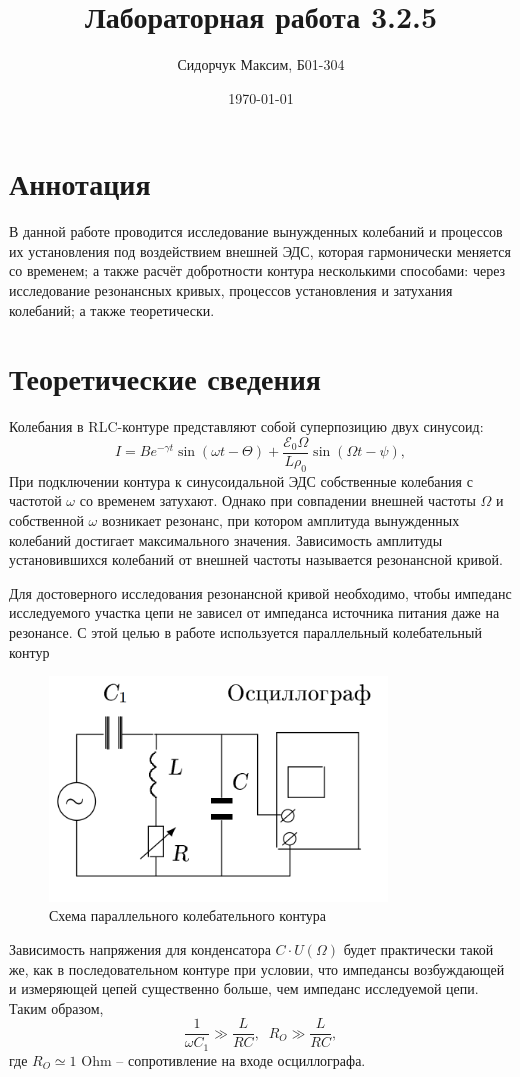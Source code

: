 \documentclass{lab}
\title {Лабораторная работа 3.2.5}
\author {Сидорчук Максим, Б01-304}
\date{\today}
\begin{document}
\maketitle

\section{Аннотация}
В данной работе проводится исследование вынужденных колебаний и процессов их установления под воздействием внешней ЭДС, которая гармонически меняется со временем; а также расчёт добротности контура несколькими способами: через исследование резонансных кривых, процессов установления и затухания колебаний; а также теоретически.
\section{Теоретические сведения}

Колебания в RLC-контуре представляют собой суперпозицию двух синусоид:
\begin{equation}
    I= B e^{-\gamma t} \sin (\omega t - \Theta)+ \frac{\mathcal{E}_0 \Omega}{L \rho_0} \sin (\Omega t - \psi),
    \label{law}
\end{equation}
При подключении контура к синусоидальной ЭДС собственные колебания с частотой $\omega$ со временем затухают. Однако при совпадении внешней частоты $ \Omega $ и собственной $ \omega $ возникает резонанс, при котором амплитуда вынужденных колебаний достигает максимального значения. Зависимость амплитуды установившихся колебаний от внешней частоты называется резонансной кривой.

Для достоверного исследования резонансной кривой необходимо, чтобы импеданс исследуемого участка цепи не зависел от импеданса источника питания даже на резонансе. С этой целью в работе используется параллельный колебательный контур
\begin{figure}
    \centering
    \includegraphics[width=0.8\textwidth]{Screenshot_1.png}
    \caption{Схема параллельного колебательного контура}
    \label{fig:scheme}
\end{figure}
Зависимость напряжения для конденсатора $ C \cdot U(\Omega) $ будет практически такой же, как в последовательном контуре при условии, что импедансы возбуждающей и измеряющей цепей существенно больше, чем импеданс исследуемой цепи. Таким образом,
\begin{equation}
    \frac{1}{\omega C_1}\gg \frac{L}{R C}, \; \; R_O \gg \frac{L}{R C},
\end{equation}
где $ R_O \simeq 1$ Ohm -- сопротивление на входе осциллографа.
\end{document}
